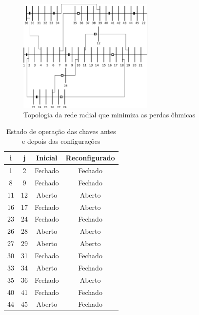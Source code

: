 \begin{figure}[H]
    \centering
    \includegraphics[width = 0.6\textwidth]{7_Results/img/rede_otimizada.png}
    \caption{Topologia da rede radial que minimiza as perdas ôhmicas}
    \label{fig:45final}
\end{figure}

\begin{table}[H]
    \centering
    \caption{Estado de operação das chaves antes e depois das configurações}
    \begin{tabular}{|c|c|c|c|}
    \hline
        i  &   j & Inicial & Reconfigurado\\ \hline
        1  &   2 & Fechado & Fechado\\ \hline
        8  &   9 & Fechado & Fechado\\ \hline                
        11 &  12 & Aberto  & Aberto \\ \hline   
        16 &  17 & Fechado & Aberto \\ \hline       
        23 &  24 & Fechado & Fechado \\ \hline       
        26 &  28 & Aberto  & Aberto \\ \hline            
        27 &  29 & Aberto  & Aberto\\ \hline            
        30 &  31 & Fechado & Fechado\\ \hline                
        33 &  34 & Aberto  & Fechado\\ \hline                
        35 &  36 & Fechado & Aberto\\ \hline                
        40 &  41 & Fechado & Fechado\\ \hline                    
        44 &  45 & Aberto  & Fechado\\ \hline
    \end{tabular}
    \label{tab:my_label}
\end{table}

